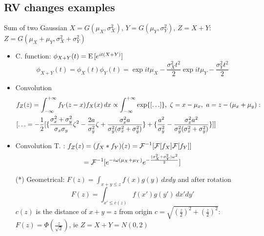 \documentclass[asd-beamer.tex]{subfiles}
\begin{document}
\subsection{RV changes examples}

\begin{frame}{Sum of two Gaussian}
$X=G(\mu_X,\sigma_X^2)$, $Y=G(\mu_Y,\sigma_Y^2)$, $Z=X+Y$: $Z=G(\mu_X+\mu_Y,\sigma_X^2+\sigma_Y^2)$
\begin{itemize}
\item C. function: $\phi_{X+Y}(t)=\operatorname{E}{[e^{it(X+Y)}]}$
\[\phi_{X+Y}(t)=\phi_X(t)\phi_Y(t)=\exp{it\mu_X-\frac{\sigma_X^2t^2}{2}}\exp{it\mu_Y-\frac{\sigma_Y^2t^2}{2}}\]
\item Convolution
\begin{align*}
&f_Z(z)=\int_{-\infty}^{+\infty}{}f_Y(z-x)f_X(x)\,dx\propto\int_{-\infty}^{+\infty}{}\text{exp}\{[\ldots]\},\ \zeta=x-\mu_x,\ a=z-(\mu_x+\mu_y):\\ &[\ldots=-\frac{1}{2}[\{\frac{\sigma_x^2+\sigma_y^2}{\sigma_x\sigma_y}\zeta^2-\frac{2a}{\sigma_y^2}\zeta+\frac{\sigma_x^2a}{\sigma_y^2(\sigma_x^2+\sigma_y^2)}\}+\{\frac{a^2}{\sigma_y^2}-\frac{\sigma_x^2a^2}{\sigma_y^2(\sigma_x^2+\sigma_y^2)}\}]]
\end{align*}
\item Convolution T. : $f_Z(z)=(f_X*f_Y)(z)={\mathcal{F}{}}^{-1}[\mathcal{F}{[f_X]}\mathcal{F}{[f_Y]}]$
\[={\mathcal{F}{}}^{-1}[e^{-i\omega(\mu_X+\mu_Y)}e^{-\frac{(\sigma_X^2+\sigma_Y^2)\omega^2}{2}}]\]
\item[(*)] Geometrical: $F(z)=\int_{x+y\leq z}f(x)g(y)\,dxdy$ and after rotation
\[F(z)=\int_{x'\leq c(z)}f(x')g(y')\,dx'dy'\]
$c(z)$ is the distance of $x+y=z$ from origin $c=\sqrt{(\frac{z}{2})^2+(\frac{z}{2})^2}$: $F(z)=\Phi(\frac{z}{\sqrt{2}})$, ie $Z=X+Y=N(0,2)$
\end{itemize}
\end{frame}

\begin{wordonframe}{}

\end{wordonframe}
\end{document}
